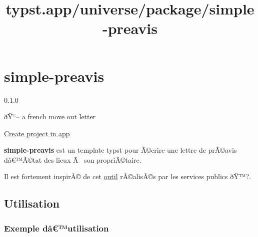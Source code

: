 \title{typst.app/universe/package/simple-preavis}

\label{banner}
\label{template-thumbnail}

\section{simple-preavis}\label{simple-preavis}

{ 0.1.0 }

ðŸ``-- a french move out letter

\href{/app?template=simple-preavis&version=0.1.0}{Create project in app}

\label{readme}
\textbf{simple-preavis} est un template typst pour Ã©crire une lettre de
prÃ©avis dâ€™Ã©tat des lieux Ã~ son propriÃ©taire.

Il est fortement inspirÃ© de cet
\href{https://www.service-public.fr/simulateur/calcul/CongeLogement}{outil}
rÃ©alisÃ©s par les services publics ðŸ™?.

\subsection{Utilisation}\label{utilisation}

\subsubsection{Exemple dâ€™utilisation}\label{exemple-duxe2utilisation}

\begin{Shaded}
\begin{Highlighting}[]
\NormalTok{    )}
\NormalTok{  ),}
\NormalTok{    ),}
\NormalTok{  ),}
\NormalTok{)}
\end{Highlighting}
\end{Shaded}

